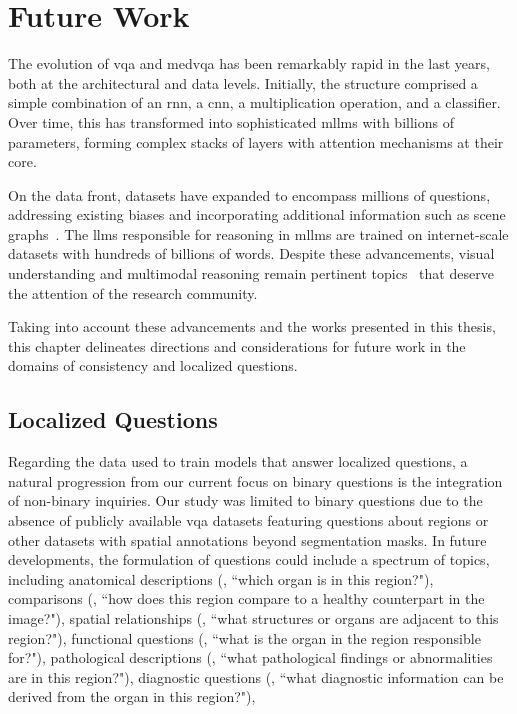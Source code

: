 


\chapter{Future Work}
\label{chapter:future_work}

The evolution of \gls{vqa} and \gls{medvqa} has been remarkably rapid in the last years, both at the architectural and data levels. Initially, the structure comprised a simple combination of an \gls{rnn}, a \gls{cnn}, a multiplication operation, and a classifier. Over time, this has transformed into sophisticated \glspl{mllm} with billions of parameters, forming complex stacks of layers with attention mechanisms at their core.

On the data front, datasets have expanded to encompass millions of questions, addressing existing biases and incorporating additional information such as scene graphs~\cite{hudson2019gqa}. The \glspl{llm} responsible for reasoning in \glspl{mllm} are trained on internet-scale datasets with hundreds of billions of words. Despite these advancements, visual understanding and multimodal reasoning remain pertinent topics~\cite{tong2024eyes,wang2024exploring,wei2023enhancing,fan2024muffin} that deserve the attention of the research community.

Taking into account these advancements and the works presented in this thesis, this chapter delineates directions and considerations for future work in the domains of consistency and localized questions.

\newpage

\section{Localized Questions}

Regarding the data used to train models that answer localized questions, a natural progression from our current focus on binary questions is the integration of non-binary inquiries. Our study was limited to binary questions due to the absence of publicly available \gls{vqa} datasets featuring questions about regions or other datasets with spatial annotations beyond segmentation masks. In future developments, the formulation of questions could include a spectrum of topics, including anatomical descriptions (\eg, ``which organ is in this region?"), comparisons (\eg, ``how does this region compare to a healthy counterpart in the image?"), spatial relationships (\eg, ``what structures or organs are adjacent to this region?"), functional questions (\eg, ``what is the organ in the region responsible for?"), pathological descriptions (\eg, ``what pathological findings or abnormalities are in this region?"), diagnostic questions (\eg, ``what diagnostic information can be derived from the organ in this region?"), \etc 

